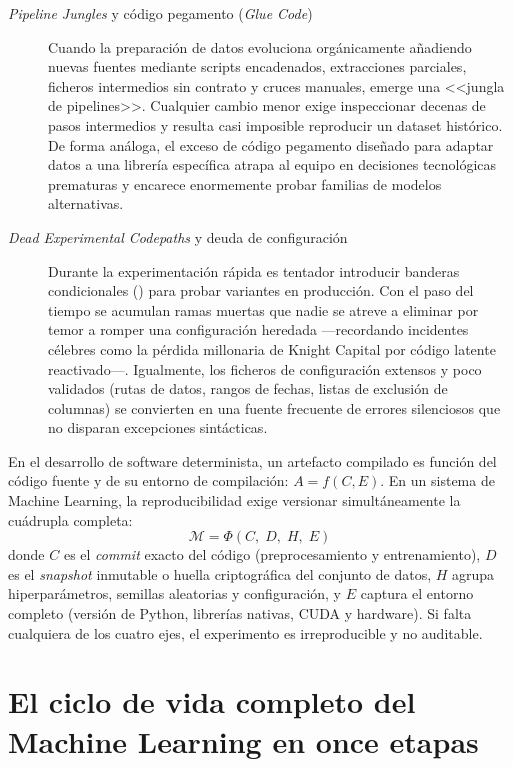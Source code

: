 \begin{description}
  \item[\textit{Pipeline Jungles} y código pegamento (\textit{Glue Code})]
  Cuando la preparación de datos evoluciona orgánicamente añadiendo nuevas fuentes mediante scripts encadenados, extracciones parciales, ficheros intermedios sin contrato y cruces manuales, emerge una <<jungla de pipelines>>. Cualquier cambio menor exige inspeccionar decenas de pasos intermedios y resulta casi imposible reproducir un dataset histórico. De forma análoga, el exceso de código pegamento diseñado para adaptar datos a una librería específica atrapa al equipo en decisiones tecnológicas prematuras y encarece enormemente probar familias de modelos alternativas.

  \item[\textit{Dead Experimental Codepaths} y deuda de configuración]
  Durante la experimentación rápida es tentador introducir banderas condicionales () para probar variantes en producción. Con el paso del tiempo se acumulan ramas muertas que nadie se atreve a eliminar por temor a romper una configuración heredada ---recordando incidentes célebres como la pérdida millonaria de Knight Capital por código latente reactivado---. Igualmente, los ficheros de configuración extensos y poco validados (rutas de datos, rangos de fechas, listas de exclusión de columnas) se convierten en una fuente frecuente de errores silenciosos que no disparan excepciones sintácticas.
\end{description}

\begin{infobox}
En el desarrollo de software determinista, un artefacto compilado es función del código fuente y de su entorno de compilación: $A = f(C, E)$. En un sistema de Machine Learning, la reproducibilidad exige versionar simultáneamente la cuádrupla completa:
\[
\mathcal{M} = \Phi(C,\; D,\; H,\; E)
\]
donde $C$ es el \textit{commit} exacto del código (preprocesamiento y entrenamiento), $D$ es el \textit{snapshot} inmutable o huella criptográfica del conjunto de datos, $H$ agrupa hiperparámetros, semillas aleatorias y configuración, y $E$ captura el entorno completo (versión de Python, librerías nativas, CUDA y hardware). Si falta cualquiera de los cuatro ejes, el experimento es irreproducible y no auditable.
\end{infobox}

\section[El ciclo de vida del ML en once etapas]{El ciclo de vida completo del Machine Learning en once etapas}\label{sec:mlops-ciclo-11-etapas}

